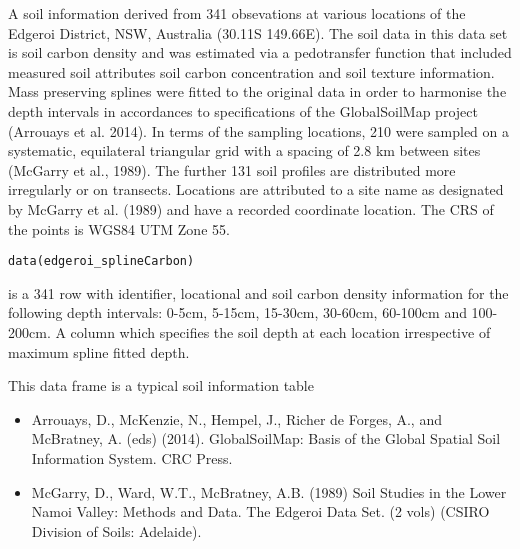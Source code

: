 \documentclass[a4paper]{book}
\begin{document}
%
\begin{Description}
A soil information  derived from 341 obsevations at various locations of the Edgeroi District, NSW, Australia (30.11S 149.66E). The soil data in this data set is soil carbon density and was estimated via a pedotransfer function that included measured soil attributes soil carbon concentration and soil texture information. Mass preserving splines were fitted to the original data in order to harmonise the depth intervals in accordances to specifications of the GlobalSoilMap project (Arrouays et al. 2014). In terms of the sampling locations, 210 were sampled on a systematic, equilateral triangular grid with a spacing of 2.8 km between sites (McGarry et al., 1989). The further 131 soil profiles are distributed more irregularly or on transects. Locations are attributed to a site name as designated by McGarry et al. (1989) and have a recorded coordinate location. The CRS of the points is WGS84 UTM Zone 55.
\end{Description}
%
\begin{Usage}
\begin{verbatim}
data(edgeroi_splineCarbon)
\end{verbatim}
\end{Usage}
%
\begin{Format}
 is a 341 row  with identifier, locational and soil carbon density information for the following depth intervals: 0-5cm, 5-15cm, 15-30cm, 30-60cm, 60-100cm and 100-200cm. A column which specifies the soil depth at each location irrespective of maximum spline fitted depth. 
\end{Format}
%
\begin{Details}
This data frame is a typical soil information table
\end{Details}
%
\begin{References}
\begin{itemize}

\item{} Arrouays, D., McKenzie, N., Hempel, J., Richer de Forges, A., and McBratney, A. (eds) (2014). GlobalSoilMap: Basis of the Global Spatial Soil Information System. CRC Press.
\item{} McGarry, D., Ward, W.T., McBratney, A.B. (1989) Soil Studies in the Lower Namoi Valley: Methods and Data. The Edgeroi Data Set. (2 vols) (CSIRO Division of Soils: Adelaide).

\end{itemize}

\end{References}
\end{document}
